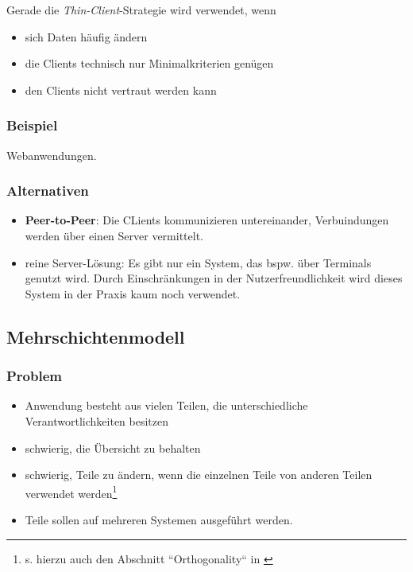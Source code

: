 Gerade die \textit{Thin-Client}-Strategie wird verwendet, wenn

\begin{itemize}
    \item sich Daten häufig ändern
    \item die Clients technisch nur Minimalkriterien genügen
    \item den Clients nicht vertraut werden kann
\end{itemize}

\subsubsection*{Beispiel}
Webanwendungen.

\subsubsection*{Alternativen}
\begin{itemize}
    \item \textbf{Peer-to-Peer}: Die CLients kommunizieren untereinander, Verbuindungen werden über einen Server  vermittelt.
    \item reine Server-Lösung: Es gibt nur ein System, das bspw. über Terminals genutzt wird.
    Durch Einschränkungen in der Nutzerfreundlichkeit wird dieses System in der Praxis kaum noch verwendet.
\end{itemize}


\subsection{Mehrschichtenmodell}

\subsubsection*{Problem}
\begin{itemize}
    \item Anwendung besteht aus vielen Teilen, die unterschiedliche Verantwortlichkeiten besitzen
    \item schwierig, die Übersicht zu behalten
    \item schwierig, Teile zu ändern, wenn die einzelnen Teile von anderen Teilen verwendet werden\footnote{
     s. hierzu auch den Abschnitt ``Orthogonality`` in \cite[39 ff.]{TH19}
    }
    \item Teile sollen auf mehreren Systemen ausgeführt werden.
\end{itemize}

